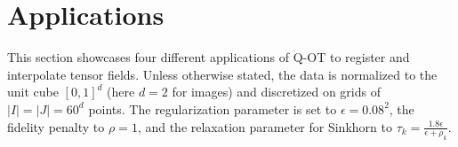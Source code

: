


\section{Applications}
\label{sec:appli}

This section showcases four different applications of Q-OT to register and interpolate tensor fields.
%
Unless otherwise stated, the data is normalized to the unit cube $[0,1]^d$ (here $d=2$ for images) and discretized on grids of $|I|=|J|=60^d$ points. 
%
The regularization parameter is set to $\epsilon=0.08^2$, the fidelity penalty to $\rho=1$, and the relaxation parameter for Sinkhorn to $\tau_k=\tfrac{1.8 \epsilon}{\epsilon+\rho_k}$. 









